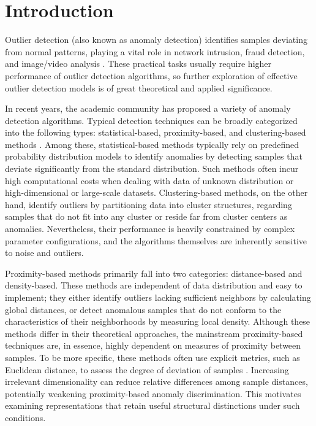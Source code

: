\documentclass[ASNA,twocolumn]{USG} %
\begin{document}

\maketitle


\section{Introduction}\label{Introduction}

Outlier detection (also known as anomaly detection) identifies samples deviating from normal patterns, playing a vital role in network intrusion, fraud detection, and image/video analysis \cite{choras2012statistical, hilal2022financial, pei2024robust, shaik2025leveraging}. These practical tasks usually require higher performance of outlier detection algorithms, so further exploration of effective outlier detection models is of great theoretical and applied significance.

In recent years, the academic community has proposed a variety of anomaly detection algorithms. Typical detection techniques can be broadly categorized into the following types: statistical-based, proximity-based, and clustering-based methods \cite{smiti2020critical}.
Among these, statistical-based methods typically rely on predefined probability distribution models to identify anomalies by detecting samples that deviate significantly from the standard distribution. Such methods often incur high computational costs when dealing with data of unknown distribution or high-dimensional or large-scale datasets. Clustering-based methods, on the other hand, identify outliers by partitioning data into cluster structures, regarding samples that do not fit into any cluster or reside far from cluster centers as anomalies. Nevertheless, their performance is heavily constrained by complex parameter configurations, and the algorithms themselves are inherently sensitive to noise and outliers.

Proximity-based methods primarily fall into two categories: distance-based and density-based. These methods are independent of data distribution and easy to implement; they either identify outliers lacking sufficient neighbors by calculating global distances, or detect anomalous samples that do not conform to the characteristics of their neighborhoods by measuring local density. Although these methods differ in their theoretical approaches, the mainstream proximity-based techniques are, in essence, highly dependent on measures of proximity between samples.
To be more specific, these methods often use explicit metrics, such as Euclidean distance, to assess the degree of deviation of samples \cite {mandhare2017comparative}. Increasing irrelevant dimensionality can reduce relative differences among sample distances, potentially weakening proximity-based anomaly discrimination. This motivates examining representations that retain useful structural distinctions under such conditions.
\end{document}

